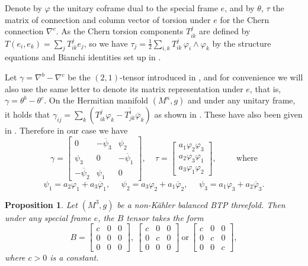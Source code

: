 \documentclass{amsart}
\numberwithin{equation}{section}
\newtheorem{proposition}[theorem]{Proposition}
\theoremstyle{definition}
\renewcommand{\1}{\mathds{1}}
\renewcommand{\>}{\rightarrow}
\begin{document}
Denote by $\varphi$ the unitary coframe dual to the special frame $e$, and by $\theta$, $\tau$ the matrix of connection and column vector of torsion under $e$ for the Chern connection $\nabla^c$. As the Chern torsion components $T^j_{ik}$ are defined by $T(e_i, e_k) = \sum_j T^j_{ik}e_j$, so we have $\tau_j =\frac{1}{2} \sum_{i,k} T^j_{ik}\,\varphi_i \wedge \varphi_k$ by the structure equations and Bianchi identities
set up in \cite[Section 2]{ZhaoZ24}.

Let $\gamma =\nabla^b -\nabla^c$ be the $(2,1)$-tensor introduced in \cite{YZ18Cur}, and for convenience we will also use the same letter to denote its matrix representation under $e$, that is, $\gamma = \theta^b - \theta^c$. On the Hermitian manifold $(M^n,g)$ and under any unitary frame, it holds that $\gamma_{ij}=\sum_k (T^j_{ik}\varphi_k - \overline{T^i_{jk}} \overline{\varphi}_k)$ as shown in \cite{YZ18Cur}.
These have also been given in \cite[Section 2]{ZhaoZ24}. Therefore in our case we have
\begin{equation} \label{eq:6.7}
\gamma = \begin{bmatrix} 0 & -\overline{\psi}_3  & \psi_2 \\ \psi_3 & 0 & -\overline{\psi}_1 \\ - \overline{\psi}_2 & \psi_1 &  0 \end{bmatrix}\!\!, \ \ \ \ \ \tau = \begin{bmatrix} a_1 \varphi_2\varphi_3 \\ a_2 \varphi_3\varphi_1 \\ a_3 \varphi_1\varphi_2  \end{bmatrix}\!\!,     \hspace{1cm} \mbox{where}
\end{equation}
\begin{equation} \label{eq:6.8}
\psi_1 = a_2\varphi_1+a_3\overline{\varphi}_1, \ \ \ \ \ \ \psi_2 = a_3\varphi_2+a_1\overline{\varphi}_2, \ \ \  \ \ \ \psi_3 = a_1\varphi_3+a_2\overline{\varphi}_3.
\end{equation}



\begin{proposition}\label{Btype}
Let $(M^3,g)$ be a non-K\"ahler balanced BTP threefold. Then under any special frame $e$, the $B$ tensor takes the form
\[B = \begin{bmatrix}  c & 0  & 0 \\ 0 & 0 &  0  \\ 0 & 0 & 0 \end{bmatrix}\!\!,\
\begin{bmatrix}  c & 0  & 0 \\ 0 & c &  0  \\ 0 & 0 & 0 \end{bmatrix}\  \text{or} \
\begin{bmatrix}  c & 0  & 0 \\ 0 & c &  0  \\ 0 & 0 & c \end{bmatrix}\!\!,\]
where $c>0$ is a constant.
\end{proposition}
\end{document}
